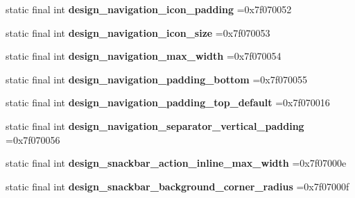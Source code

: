 \begin{DoxyCompactItemize}
\item 
\hypertarget{classcheck_1_1test_1_1_r_1_1dimen_aa8e230900ede110bb53d60933d2e0336}{}static final int {\bfseries design\+\_\+navigation\+\_\+icon\+\_\+padding} =0x7f070052\label{classcheck_1_1test_1_1_r_1_1dimen_aa8e230900ede110bb53d60933d2e0336}

\item 
\hypertarget{classcheck_1_1test_1_1_r_1_1dimen_a14c927d4482d5a97341930e5401c20f1}{}static final int {\bfseries design\+\_\+navigation\+\_\+icon\+\_\+size} =0x7f070053\label{classcheck_1_1test_1_1_r_1_1dimen_a14c927d4482d5a97341930e5401c20f1}

\item 
\hypertarget{classcheck_1_1test_1_1_r_1_1dimen_ab26487bc31eb25cfdc933fef8625eab7}{}static final int {\bfseries design\+\_\+navigation\+\_\+max\+\_\+width} =0x7f070054\label{classcheck_1_1test_1_1_r_1_1dimen_ab26487bc31eb25cfdc933fef8625eab7}

\item 
\hypertarget{classcheck_1_1test_1_1_r_1_1dimen_a285459f431857502812911576198f37a}{}static final int {\bfseries design\+\_\+navigation\+\_\+padding\+\_\+bottom} =0x7f070055\label{classcheck_1_1test_1_1_r_1_1dimen_a285459f431857502812911576198f37a}

\item 
\hypertarget{classcheck_1_1test_1_1_r_1_1dimen_a661e4de1f18821d68849a38b1f7c8273}{}static final int {\bfseries design\+\_\+navigation\+\_\+padding\+\_\+top\+\_\+default} =0x7f070016\label{classcheck_1_1test_1_1_r_1_1dimen_a661e4de1f18821d68849a38b1f7c8273}

\item 
\hypertarget{classcheck_1_1test_1_1_r_1_1dimen_a3e3aec92994f8ccb2eccdb84167aa3b4}{}static final int {\bfseries design\+\_\+navigation\+\_\+separator\+\_\+vertical\+\_\+padding} =0x7f070056\label{classcheck_1_1test_1_1_r_1_1dimen_a3e3aec92994f8ccb2eccdb84167aa3b4}

\item 
\hypertarget{classcheck_1_1test_1_1_r_1_1dimen_ae3aed91871e0622b6c0a41447b54fb55}{}static final int {\bfseries design\+\_\+snackbar\+\_\+action\+\_\+inline\+\_\+max\+\_\+width} =0x7f07000e\label{classcheck_1_1test_1_1_r_1_1dimen_ae3aed91871e0622b6c0a41447b54fb55}

\item 
\hypertarget{classcheck_1_1test_1_1_r_1_1dimen_abf8f533cdab6b9b19407b4d073c095e2}{}static final int {\bfseries design\+\_\+snackbar\+\_\+background\+\_\+corner\+\_\+radius} =0x7f07000f\label{classcheck_1_1test_1_1_r_1_1dimen_abf8f533cdab6b9b19407b4d073c095e2}


\end{DoxyCompactItemize}
